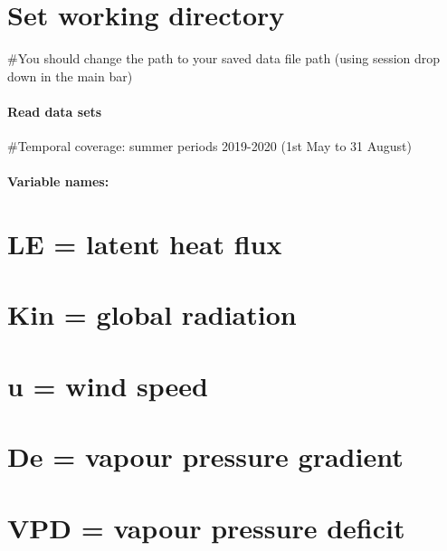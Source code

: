 \documentclass[
]{article}
\begin{document}
\hypertarget{set-working-directory}{%
\section{Set working directory}\label{set-working-directory}}

\#You should change the path to your saved data file path (using session
drop down in the main bar)

\hypertarget{read-data-sets}{%
\paragraph{Read data sets}\label{read-data-sets}}

\#Temporal coverage: summer periods 2019-2020 (1st May to 31 August)

\hypertarget{variable-names}{%
\paragraph{Variable names:}\label{variable-names}}

\hypertarget{le-latent-heat-flux}{%
\section{LE = latent heat flux}\label{le-latent-heat-flux}}

\hypertarget{kin-global-radiation}{%
\section{Kin = global radiation}\label{kin-global-radiation}}

\hypertarget{u-wind-speed}{%
\section{u = wind speed}\label{u-wind-speed}}

\hypertarget{de-vapour-pressure-gradient}{%
\section{De = vapour pressure
gradient}\label{de-vapour-pressure-gradient}}

\hypertarget{vpd-vapour-pressure-deficit}{%
\section{VPD = vapour pressure
deficit}\label{vpd-vapour-pressure-deficit}}
\end{document}
